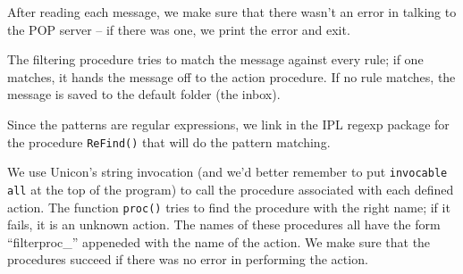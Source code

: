 After reading each message, we make sure that there
wasn't an error in talking to the POP server -- if
there was one, we print the error and exit.

The filtering procedure tries to match the message against every rule;
if one matches, it hands the message off to the action procedure. If no
rule matches, the message is saved to the default folder (the inbox).


Since the patterns are regular expressions, we link in the IPL regexp
package for the procedure \texttt{ReFind()} that will do the pattern
matching.


We use Unicon's string invocation (and
we'd better remember to put \texttt{invocable all} at
the top of the program) to call the procedure associated with each
defined action. The function \texttt{proc()} tries to find the
procedure with the right name; if it fails, it is an unknown action.
The names of these procedures all have the form
{\textquotedblleft}filterproc\_{\textquotedblright} appeneded with the
name of the action. We make sure that the procedures succeed if there
was no error in performing the action.

